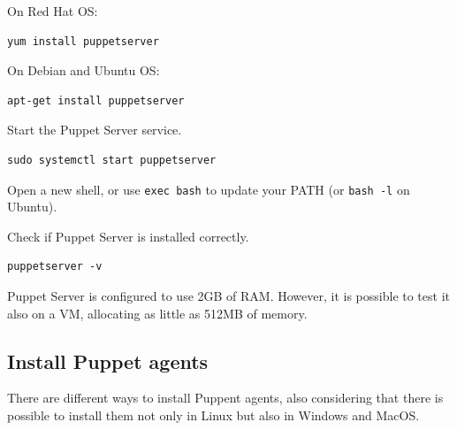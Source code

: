\documentclass[12pt,a4paper,openright,twoside]{book}
\begin{document}
On Red Hat OS:
\begin{lstlisting}
yum install puppetserver
\end{lstlisting}

On Debian and Ubuntu OS:
\begin{lstlisting}
apt-get install puppetserver
\end{lstlisting}

Start the Puppet Server service.
\begin{lstlisting}
sudo systemctl start puppetserver
\end{lstlisting}

Open a new shell, or use \texttt{exec bash} to update your PATH (or \texttt{bash -l} on Ubuntu).


Check if Puppet Server is installed correctly.
\begin{lstlisting}
puppetserver -v
\end{lstlisting}


Puppet Server is configured to use 2GB of RAM. However, it is possible to test it also on a VM, allocating as little as 512MB of memory. 

\cite{puppetDocSupportServer}

\subsection{Install Puppet agents}
There are different ways to install Puppent agents, also considering that there is possible to install them not only in Linux but also in Windows and MacOS.


\end{document}
